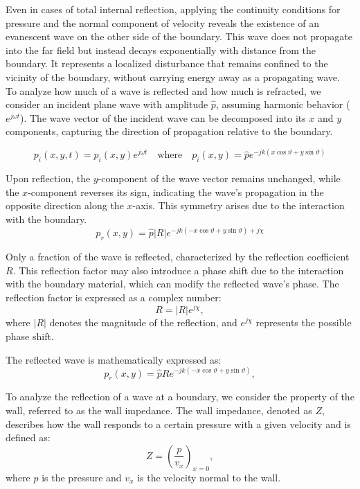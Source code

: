 \documentclass[a4paper]{article}
\begin{document}
Even in cases of total internal reflection, applying the continuity conditions for pressure and the normal component of velocity reveals the existence of an evanescent wave on the other side of the boundary. This wave does not propagate into the far field but instead decays exponentially with distance from the boundary. It represents a localized disturbance that remains confined to the vicinity of the boundary, without carrying energy away as a propagating wave.\\

To analyze how much of a wave is reflected and how much is refracted, we consider an incident plane wave with amplitude \(\hat{p}\), assuming harmonic behavior (\(e^{j\omega t}\)). The wave vector of the incident wave can be decomposed into its \(x\) and \(y\) components, capturing the direction of propagation relative to the boundary. 

\[
p_i(x, y, t) = p_i(x, y) e^{j \omega t} \quad \text{where} \quad p_i(x, y) = \hat{p} e^{-j k (x \cos \vartheta + y \sin \vartheta)}
\]

Upon reflection, the \(y\)-component of the wave vector remains unchanged, while the \(x\)-component reverses its sign, indicating the wave's propagation in the opposite direction along the \(x\)-axis. This symmetry arises due to the interaction with the boundary.
\[
p_r(x, y) = \hat{p} |R| e^{-j k (-x \cos \vartheta + y \sin \vartheta) + j \chi}
\]

Only a fraction of the wave is reflected, characterized by the reflection coefficient \(R\). This reflection factor may also introduce a phase shift due to the interaction with the boundary material, which can modify the reflected wave's phase. The reflection factor is expressed as a complex number:
\[
R = |R| e^{j\chi},
\]
where \(|R|\) denotes the magnitude of the reflection, and \(e^{j\chi}\) represents the possible phase shift.

The reflected wave is mathematically expressed as:
\[
p_r(x, y) = \hat{p} R e^{-j k (-x \cos \vartheta + y \sin \vartheta)},
\]





To analyze the reflection of a wave at a boundary, we consider the property of the wall, referred to as the wall impedance. The wall impedance, denoted as \( Z \), describes how the wall responds to a certain pressure with a given velocity and is defined as:
\[
Z = \left( \frac{p}{v_x} \right)_{x=0},
\]
where \( p \) is the pressure and \( v_x \) is the velocity normal to the wall.
\end{document}
